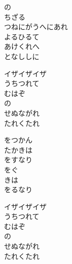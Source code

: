 \documentclass[10pt,b5j]{tarticle} %
\begin{document}
\vspace{1.5em} %
\newcommand{\linespace}{0.5em} %
\newcommand{\blocksize}{0.5\hsize} %
\begin{enumerate} %
    \begin{minipage}[c]{\blocksize}
    
        \vspace{\linespace}
        \item
        の\\
        ちざる\\
        つねにがうへにあれ\\
        よるひるて\\
        あけくれへ\\
        となししに
        
        \vspace{\linespace}
        \item
        イザイザイザ\\
        うちつれて\\
        むはぞ\\
        の\\
        せぬながれ\\
        たれくたれ
        
        \vspace{\linespace}
        \item
        をつかん\\
        たかきは\\
        をすなり\\
        をぐ\\
        きは\\
        をるなり
        
        \vspace{\linespace}
        \item
        イザイザイザ\\
        うちつれて\\
        むはぞ\\
        の\\
        せぬながれ\\
        たれくたれ
        

\end{minipage}
\end{enumerate}
\end{document}

